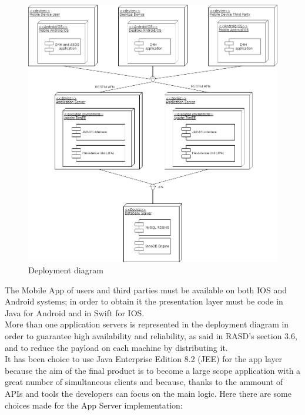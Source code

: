 \begin{figure}[h!]
	\includegraphics[width=1.0\textwidth]{./pictures/deployment_diagram.png}\par
	\caption{Deployment diagram}
\end{figure}
\FloatBarrier The Mobile App of users and third parties must be available on both IOS and Android systems; in order to obtain it the presentation layer must be code in Java for Android and in Swift for IOS.\\
More than one application servers is represented in the deployment diagram in order to guarantee high availability and reliability, as said in RASD's section 3.6,  and to reduce the payload on each machine by distributing it.\\
It has been choice to use Java Enterprise Edition 8.2 (JEE) for the app layer because the aim of the final product is to become a large scope application with a great number of simultaneous clients and because, thanks to the ammount of APIs and tools the developers can focus on the main logic.
Here there are some choices made for the App Server implementation:
